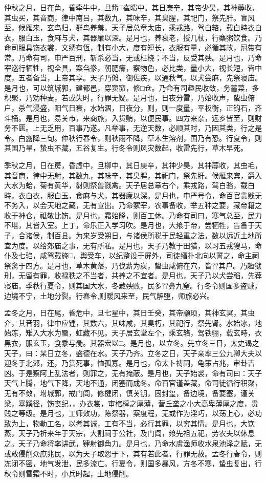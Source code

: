 \documentclass[]{article}
\begin{document}
仲秋之月，日在角，昏牵牛中，旦觜□崔瞆中。其日庚辛，其帝少昊，其神蓐收，其虫买，其音商，律中南吕，其数九，其味辛，其臭腥，其祀门，祭先肝。盲风至，候雁来，玄鸟归，群鸟养羞。天子居总章太庙，乘戎路，驾白辂，载白畤衣白衣，服白玉，食麻与犬，其器廉以深。是月也，养衰老，授几杖，行麋粥饮食。乃命司服具饬衣裳，文绣有恆，制有小大，度有短长，衣服有量，必循其故，冠带有常。乃命有司，申严百刑，斩杀必当，无或枉桡；不当，反受其殃。是月也，乃命宰巡行牺牲，视全具，案刍豢，朝肥瘠，察物色，必比类，量小大，视长短，皆中度，五者备当，上帝其享。天子乃傩，御佐疾，以通秋气。以犬尝麻，先祭寝庙。是月也，可以筑城郭，建都邑，穿窦窌，修□仓。乃命有司趣民收敛，务蓄菜，多积聚，乃劝种麦，若或失时，行罪无疑。是月也，日夜分雷，乃始收声，蛰虫俯户，杀气浸盛，阳气日衰，水始涸，日夜分，则，则一度量，平权衡，正钧石，齐斗桶。是月也，易关市，来商旅，入货贿，以便民事。四方来杂，远乡皆至，则财务不匮。上无乏用，百事乃遂。凡举事，无逆天数，必顺其时，乃因其类，行之是令。白露降三旬。仲秋行春令，则秋雨不降，草木生溶剂，国乃有恐。行夏令，则其国乃旱，蛰虫不藏，五谷复生。行冬令则风灾数起，收雷先行，草木早死。

季秋之月，日在房，昏虚中，旦柳中，其日庚辛，其神少昊，其神蓐收，其虫毛，其音商，律中无射，其数九，其味辛，其臭腥，其祀门，祭先肝。候雁来宾，爵入大水为蛤，菊有黄华，豺则祭兽戮禽。天子居总章右个，乘戎路，驾白骆，载白畤，衣白衣，服白玉，食麻与犬，其器廉以深。是月也，申严号令，命百官贵贱无不务入，以会天地之藏，无有宣出。乃命冢宰，农事备收，举五种之要，藏帝籍之收于神仓，祗敬比饬。是月也，霜始降，则百工休。乃命有司曰，寒气总至，民力不堪，其皆入室。上丁，命乐正入学习吹。是月也，大飨于帝，尝牺牲，告备于天子，合诸侯，制百县。为来岁受朔日，与诸侯所税于民轻重之法，数以远近土地所宜为度。以给郊庙之事，无有所私。是月也，天子乃教于田猎，以习五戎獀马，命仆及七驺，咸驾载旍□，舆受车，以纪整设于屏外，司徒缙扑北向以誓之，命主祠祭禽于四方。是月也，草木黄落，乃伐薪为炭，蛰虫咸俯在穴，皆??其户。乃趣狱刑，无留有罪，收禄秩之不当者，共养之不宜者。是月也，天子乃以犬尝稻，先荐寝庙。季秋行夏令，则其国大水，冬藏殃败，民多??鼻九窒。行冬令则国多盗贼，边境不宁，土地分裂。行春令,则暖风来至，民气解堕，师旅必兴。

孟冬之月，日在尾，昏危中，旦七星中，其日壬癸，其帝颛顼，其神玄冥，其虫介，其音羽，律中应锺，其数六，其味咸，其臭朽，其祀行，祭先肾。水始冰，地始冻，雉入大水为蜃，虹藏不见。天子居玄堂左个，乘玄辂，驾铁骊，载玄畤，衣黑衣，服玄玉，食黍与彘。其器宏以□。是月也，以立冬。先立冬三日，太史谒之天子，曰：某日立冬，盛德在水。天子乃齐。立冬之日，天子亲率三公九卿大夫以迎冬于北郊，还，乃赏死事，恤孤寡。是月也，命太卜祷祠，龟策占兆，审卦吉凶。于是察阿上乱法者，则罪之，无有掩蔽。是月也，天子始裘，命有司曰：天子天气上腾，地气下降，天地不通，闭塞而成冬。命百官谨盖藏，命司徒循行积聚，无有不敛，坿城郭，戒门闾，修楗闭，慎关钥，固封玺，备边境，备要塞，谨关梁，塞蹊径，饬丧纪，，办衣裳，审棺椁之厚薄，营丘垄之小大高卑薄厚之度，贵贱之等级。是月也，工师效功，陈祭器，案度程，无或作为淫巧，以荡上心，必功致为上，物勒工名，以考其诚，工有不当，必行其罪，以穷其情。是月也，大饮蒸，天子乃祈来年于天宗，大割祠于公社，及门闾，飨先祖五祀，劳农夫以休息之。天子乃命将率讲武，肄射御角力。是月也，乃命水虞渔师收水泉池泽之赋，无或敢侵削众庶兆民，以为天子取怨于下，其有若此者，行罪无赦。孟冬行春令，则冻闭不密，地气发泄，民多流亡。行夏令，则国多暴风，方冬不寒，蛰虫复出，行秋令则雪霜不时，小兵时起，土地侵削。
\end{document}
